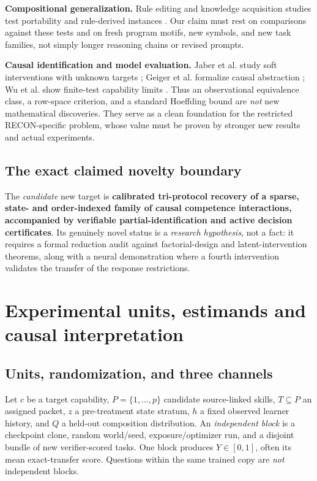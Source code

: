 \documentclass[11pt,a4paper]{article}
\theoremstyle{definition}\newtheorem{definition}[theorem]{Definition}
\theoremstyle{remark}\newtheorem{remark}[theorem]{Remark}
\begin{document}
\textbf{Compositional generalization.} Rule editing and knowledge acquisition studies test portability and rule-derived instances \citep{ruleedit,editingrules}. Our claim must rest on comparisons against these tests and on fresh program motifs, new symbols, and new task families, not simply longer reasoning chains or revised prompts.

\textbf{Causal identification and model evaluation.} Jaber et al. study soft interventions with unknown targets \citep{jaber}; Geiger et al. formalize causal abstraction \citep{geiger}; Wu et al. show finite-test capability limits \citep{wu2026}. Thus an observational equivalence class, a row-space criterion, and a standard Hoeffding bound are \emph{not} new mathematical discoveries. They serve as a clean foundation for the restricted RECON-specific problem, whose value must be proven by stronger new results and actual experiments.

\subsection{The exact claimed novelty boundary}
The \emph{candidate} new target is \textbf{calibrated tri-protocol recovery of a sparse, state- and order-indexed family of causal competence interactions, accompanied by verifiable partial-identification and active decision certificates}. Its genuinely novel status is a \emph{research hypothesis}, not a fact: it requires a formal reduction audit against factorial-design and latent-intervention theorems, along with a neural demonstration where a fourth intervention validates the transfer of the response restrictions.

\section{Experimental units, estimands and causal interpretation}\label{sec:estimand}
\subsection{Units, randomization, and three channels}
Let $c$ be a target capability, $P=\{1,\ldots,p\}$ candidate source-linked skills, $T\subseteq P$ an assigned packet, $z$ a pre-treatment state stratum, $h$ a fixed observed learner history, and $Q$ a held-out composition distribution. An \emph{independent block} is a checkpoint clone, random world/seed, exposure/optimizer run, and a disjoint bundle of new verifier-scored tasks. One block produces $Y\in[0,1]$, often its mean exact-transfer score. Questions within the same trained copy are \emph{not} independent blocks.
\end{document}
